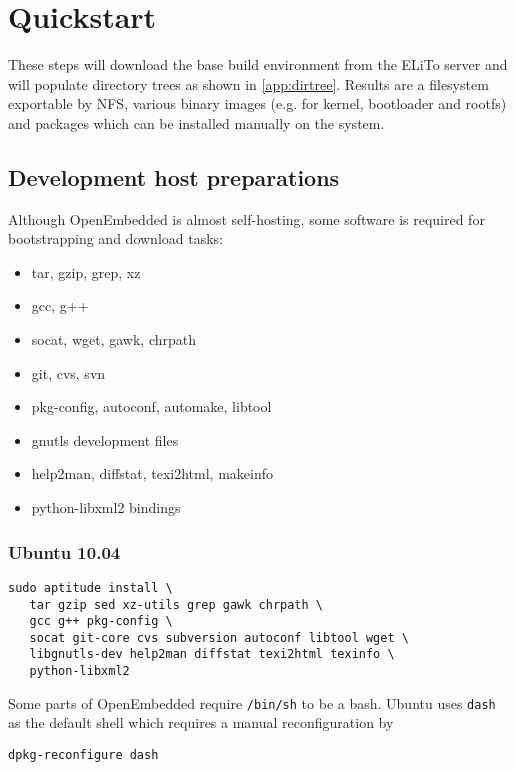\chapter{Quickstart}
\label{chap:quickstart}

These steps will download the base build environment from the ELiTo
server and will populate directory trees as shown in
\autoref{app:dirtree}. Results are a filesystem exportable by NFS,
various binary images (e.g. for kernel, bootloader and rootfs) and
packages which can be installed manually on the system.

\section{Development host preparations}

Although OpenEmbedded is almost self-hosting, some software is
required for bootstrapping and download tasks:

\begin{itemize}
\item tar, gzip, grep, xz
\item gcc, g++
\item socat, wget, gawk, chrpath
\item git, cvs, svn
\item pkg-config, autoconf, automake, libtool
\item gnutls development files
\item help2man, diffstat, texi2html, makeinfo
\item python-libxml2 bindings
\end{itemize}

\subsection*{Ubuntu 10.04}
\begin{lstlisting}[language={}]
sudo aptitude install \
   tar gzip sed xz-utils grep gawk chrpath \
   gcc g++ pkg-config \
   socat git-core cvs subversion autoconf libtool wget \
   libgnutls-dev help2man diffstat texi2html texinfo \
   python-libxml2
\end{lstlisting}

Some parts of OpenEmbedded require \texttt{/bin/sh} to be a bash.
Ubuntu uses \texttt{dash} as the default shell which requires a manual
reconfiguration by
\begin{lstlisting}[language={}]
dpkg-reconfigure dash
\end{lstlisting}


